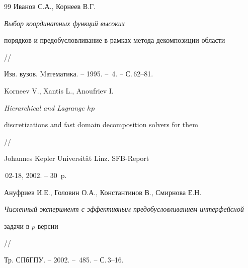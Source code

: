 \begin{thebibliography}{99}
Иванов С.А., Корнеев В.Г. {\it Выбор координатных функций высоких 


порядков и предобусловливание в рамках метода декомпозиции области} //


Изв. вузов. Mатематика. -- 1995. -- \No\,4. -- С.\,62--81.







Korneev V., Xantis L., Anoufriev I. {\it Hierarchical and Lagrange $hp$ 


discretizations and fast domain decomposition solvers for them} //


Johannes Kepler Universit\"{a}t Linz. SFB-Report


\No\,02-18, 2002. -- 30~p.







Ануфриев И.Е., Головин О.А., Константинов В., Смирнова Е.Н.


{\it Численный эксперимент с эффективным предобусловливанием интерфейсной 


задачи в $p$-версии} //


Тр. СПбГПУ. -- 2002. -- \No\,485. -- С.\,3--16.








\end{thebibliography}





\vskip 2cm











\label{end}
















